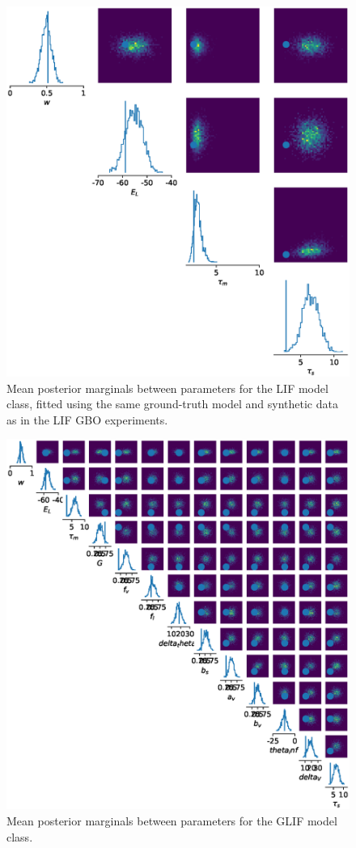 \documentclass[mphil,deptreport,ianc]{infthesis} %
\begin{document}
\begin{figure}
    \centering
	\includegraphics[width=0.5\columnwidth]{figures/sbi_p_avgs_pairplot_SNPE_LIF_12-15_04-56-19-338.eps}
	\caption{Mean posterior marginals between parameters for the LIF model class, fitted using the same ground-truth model and synthetic data as in the LIF GBO experiments.}
\end{figure}

\begin{figure}
    \centering
	\includegraphics[width=\columnwidth]{figures/sbi_p_avgs_pairplot_SNPE_GLIF_12-15_14-22-38-919.eps}
	\caption{Mean posterior marginals between parameters for the GLIF model class.}
\end{figure}
\end{document}
